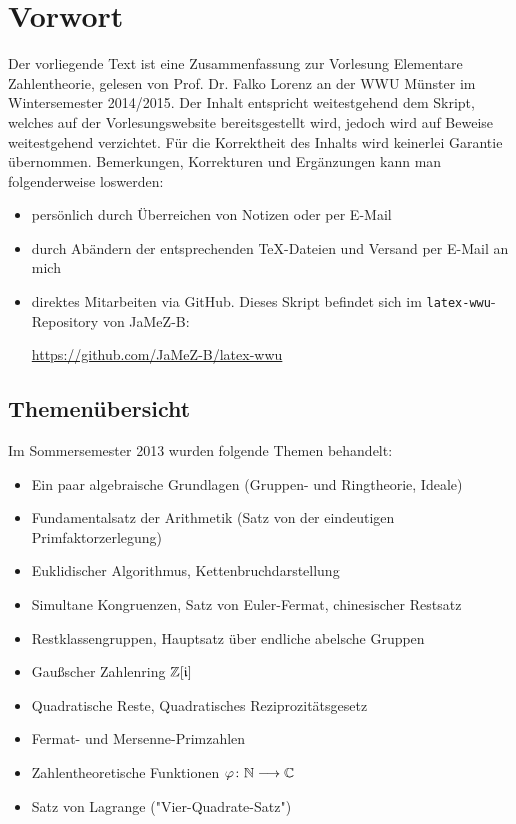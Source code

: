 \section*{Vorwort}
\label{sec:preface}
	Der vorliegende Text ist eine Zusammenfassung zur Vorlesung Elementare Zahlentheorie, gelesen von Prof. Dr. Falko Lorenz an der WWU Münster im Wintersemester 2014/2015. Der Inhalt entspricht weitestgehend dem Skript, welches auf der Vorlesungswebsite bereitsgestellt wird, jedoch wird auf Beweise weitestgehend verzichtet. Für die Korrektheit des Inhalts wird keinerlei Garantie übernommen. Bemerkungen, Korrekturen und Ergänzungen kann man folgenderweise loswerden:
	\begin{itemize}
		\item persönlich durch Überreichen von Notizen oder per E-Mail
		\item durch Abändern der entsprechenden TeX-Dateien und Versand per E-Mail an mich
		\item direktes Mitarbeiten via GitHub. Dieses Skript befindet sich im \texttt{latex-wwu}-Repository von JaMeZ-B:
		\begin{center}
			\url{https://github.com/JaMeZ-B/latex-wwu}
		\end{center}
	\end{itemize}

\subsection*{Themenübersicht}
\label{sub:content}
	Im Sommersemester 2013 wurden folgende Themen behandelt:
	\begin{itemize}
		\item Ein paar algebraische Grundlagen (Gruppen- und Ringtheorie, Ideale) 
		\item Fundamentalsatz der Arithmetik (Satz von der eindeutigen Primfaktorzerlegung) 
		\item Euklidischer Algorithmus, Kettenbruchdarstellung 
		\item Simultane Kongruenzen, Satz von Euler-Fermat, chinesischer Restsatz 
		\item Restklassengruppen, Hauptsatz über endliche abelsche Gruppen 
		\item Gaußscher Zahlenring $\mathbb{Z}[\mathfrak{i}]$ 
		\item Quadratische Reste, Quadratisches Reziprozitätsgesetz 
		\item Fermat- und Mersenne-Primzahlen 
		\item Zahlentheoretische Funktionen $\varphi\colon \mathbb{N} \longrightarrow \mathbb{C}$
		\item Satz von Lagrange ("Vier-Quadrate-Satz")	
	\end{itemize}

